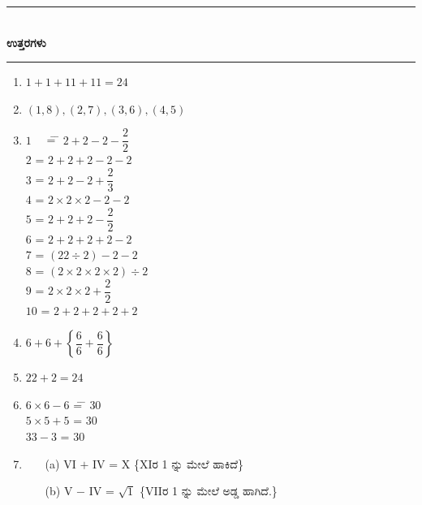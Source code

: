 \smallskip

\begin{center}
\rule{5cm}{1pt}\\[2pt]
{\Large\bfseries ಉತ್ತರಗಳು}\\[-0.1cm]
\rule{5cm}{1pt}
\end{center}


\begin{enumerate}
\itemsep=5pt

\item $1 + 1 + 11 + 11 = 24$

\smallskip
\item $(1, 8), (2, 7), (3, 6), (4, 5)$

\smallskip
\item 
\begin{tabbing}
$1$ ~~\= = \= $2 + 2 - 2 - \dfrac{2}{2}$\\[0.2cm]
$2$ \> = \> $2 + 2 + 2 - 2 - 2$\\[0.2cm]
$3$\> = \> $2 + 2 - 2 + \dfrac{2}{3}$\\[0.2cm]
$4$ \> = \> $2 \times 2 \times 2 - 2 - 2$\\[0.2cm]
$5$ \> = \> $2 + 2 + 2 - \dfrac{2}{2}$\\[0.2cm]
$6$ \> = \> $2 + 2 + 2 + 2 - 2$\\[0.2cm]
$7$ \> = \> $(22 \div 2) - 2 - 2$\\[0.2cm]
$8$ \> = \> $(2 \times 2 \times 2 \times 2) \div 2$\\[0.2cm]
$9$ \> = \> $2 \times 2 \times 2 + \dfrac{2}{2}$\\[0.2cm]
$10$ \> = \> $2 + 2 + 2 + 2 + 2$
\end{tabbing}

\smallskip
\item $6 + 6 +\left\{\dfrac{6}{6} + \dfrac{6}{6}\right\}$

\smallskip
\item $22 + 2 = 24$

\item 
\begin{tabbing}
$6 \times 6 - 6$ \= = \= $30$\\
$5 \times 5 + 5$ \> = \> $30$\\
$33 - 3$ \> = \> $30$
\end{tabbing}

\item 
\begin{itemize}
\item[(a)] VI $+$ IV = X \{XIರ 1 ನ್ನು ಮೇಲೆ ಹಾಕಿದೆ\}
\item[(b)] V $-$ IV = $\sqrt{1}$ \{VIIರ 1 ನ್ನು ಮೇಲೆ ಅಡ್ಡ ಹಾಗಿದೆ.\}
\end{itemize}


\end{enumerate}
